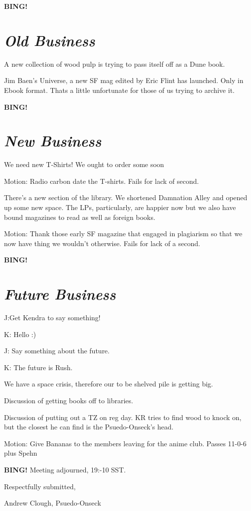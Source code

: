 \documentclass[10pt]{article}
\newcommand{\bing}{{\bf BING!} }
\newcommand{\goto}[1]{\bing \vskip 12pt \section*{{\em{#1}}}}
\newcommand{\ps}{ plus Spehn\xspace}
\begin{document}





\goto{Old Business}

A new collection of wood pulp is trying to pass itself off as a Dune book.  

Jim Baen's Universe, a new SF mag edited by Eric Flint has launched.  Only in Ebook format.  Thats a little unfortunate for those of us trying to archive it.

\goto{New Business}

We need new T-Shirts!  We ought to order some soon

Motion:  Radio carbon date the T-shirts.  Fails for lack of second.

There's a new section of the library.  We shortened Damnation Alley and opened up some new space.  The LPs, particularly, are happier now but we also have bound magazines to read as well as foreign books.

Motion:  Thank those early SF magazine that engaged in plagiarism so that we now have thing we wouldn't otherwise.  Fails for lack of a second.

\goto{Future Business}

J:Get Kendra to say something!

K:  Hello :)

J:  Say something about the future.

K:  The future is Rush.

We have a space crisis, therefore our to be shelved pile is getting big.

Discussion of getting books off to libraries.

Discussion of putting out a TZ on reg day.  KR tries to find wood to knock on, but the closest he can find is the Psuedo-Onseck's head.

Motion:  Give Bananas to the members leaving for the anime club.  Passes 11-0-6\ps

\bing
\noindent
Meeting adjourned, 19:-10 SST.

\vspace{18pt}

\centerline{Respectfully submitted,}
\centerline{Andrew Clough, Psuedo-Onseck}
\end{document}
